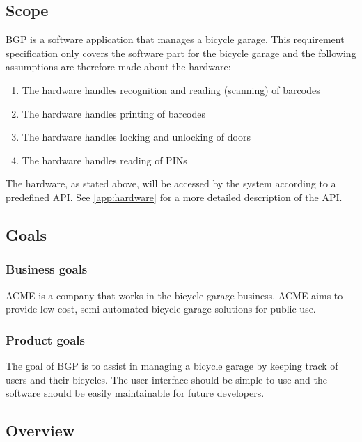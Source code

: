 \documentclass[12pt,titlepage]{article}
\begin{document}
\subsection{Scope}
BGP is a software application that manages a bicycle garage. This requirement specification only covers the software part for the bicycle garage and the following assumptions are therefore made about the hardware:
\begin{enumerate}
	\item The hardware handles recognition and reading (scanning) of barcodes
	\item The hardware handles printing of barcodes
	\item The hardware handles locking and unlocking of doors
	\item The hardware handles reading of PINs
\end{enumerate}
The hardware, as stated above, will be accessed by the system according to a predefined API. See \cref{app:hardware} for a more detailed description of the API.

\subsection{Goals}
\subsubsection{Business goals}
ACME is a company that works in the bicycle garage business. ACME aims to provide low-cost, semi-automated bicycle garage solutions for public use.
\subsubsection{Product goals}
The goal of BGP is to assist in managing a bicycle garage by keeping track of users and their bicycles. The user interface should be simple to use and the software should be easily maintainable for future developers.
\subsection{Overview}



\end{document}
